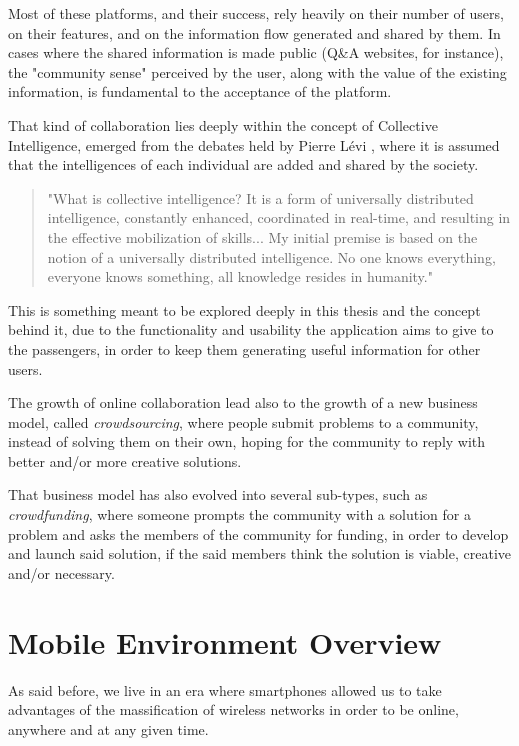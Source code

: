 Most of these platforms, and their success, rely heavily on their number of users, on their features, and on the information flow generated and shared by them. In cases where the shared information is made public (Q\&A websites, for instance), the "community sense" perceived by the user, along with the value of the existing information, is fundamental to the acceptance of the platform.

That kind of collaboration lies deeply within the concept of Collective Intelligence, emerged from the debates held by Pierre Lévi \cite{kn:Le98}, where it is assumed that the intelligences of each individual are added and shared by the society.

\begin{quote}
"What is collective intelligence? It is a form of universally distributed intelligence, constantly enhanced, coordinated in real-time, and resulting in the effective mobilization of skills... My initial premise is based on the notion of a universally distributed intelligence. No one knows everything, everyone knows something, all knowledge resides in humanity." 
\end{quote}

This is something meant to be explored deeply in this thesis and the concept behind it, due to the functionality and usability the application aims to give to the passengers, in order to keep them generating useful information for other users.

The growth of online collaboration lead also to the growth of a new business model, called \emph{crowdsourcing}, where people submit problems to a community, instead of solving them on their own, hoping for the community to reply with better and/or more creative solutions.

That business model has also evolved into several sub-types, such as \emph{crowdfunding}, where someone prompts the community with a solution for a problem and asks the members of the community for funding, in order to develop and launch said solution, if the said members think the solution is viable, creative and/or necessary.

\section{Mobile Environment Overview}\label{sec:mobove}

As said before, we live in an era where smartphones allowed us to take advantages of the massification of wireless networks in order to be online, anywhere and at any given time.

